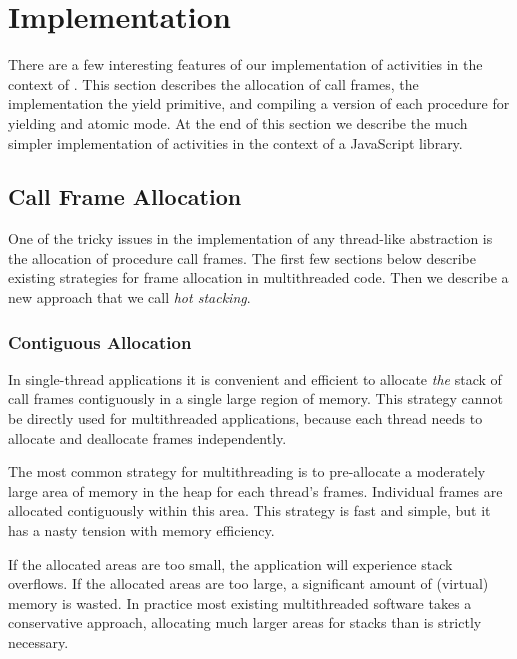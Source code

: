 \documentclass[preprint, 10pt, numbers]{sigplanconf}
\begin{document}
\section{Implementation}

There are a few interesting features of our implementation of activities in the context of \charcoal{}.
This section describes the allocation of call frames, the implementation the yield primitive, and compiling a version of each procedure for yielding and atomic mode.
At the end of this section we describe the much simpler implementation of activities in the context of a JavaScript library.

\subsection{Call Frame Allocation}

One of the tricky issues in the implementation of any thread-like abstraction is the allocation of procedure call frames.
The first few sections below describe existing strategies for frame allocation in multithreaded code.
Then we describe a new approach that we call \emph{hot stacking}.

\subsubsection{Contiguous Allocation}

In single-thread applications it is convenient and efficient to allocate \emph{the} stack of call frames contiguously in a single large region of memory.
This strategy cannot be directly used for multithreaded applications, because each thread needs to allocate and deallocate frames independently.

The most common strategy for multithreading is to pre-allocate a moderately large area of memory in the heap for each thread's frames.
Individual frames are allocated contiguously within this area.
This strategy is fast and simple, but it has a nasty tension with memory efficiency.

If the allocated areas are too small, the application will experience stack overflows.
If the allocated areas are too large, a significant amount of (virtual) memory is wasted.
In practice most existing multithreaded software takes a conservative approach, allocating much larger areas for stacks than is strictly necessary.
\end{document}
